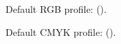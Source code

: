 \documentclass{article}
\begin{document}
Default RGB profile: \texttt{} ().

Default CMYK profile: \texttt{} ().
\makeatother
\end{document}
